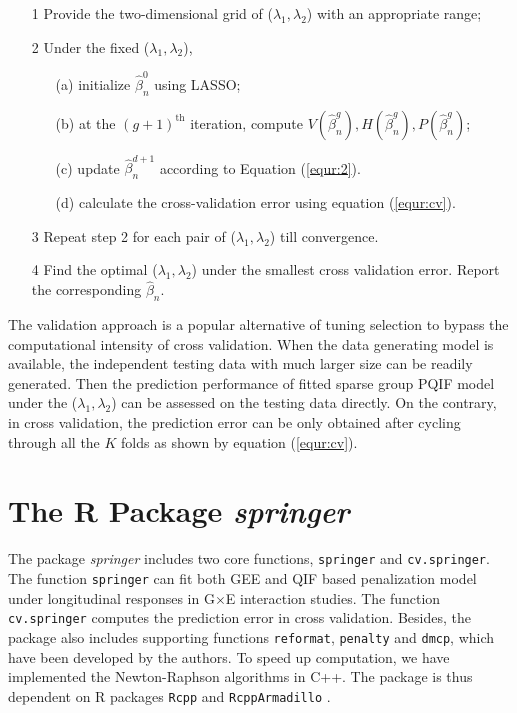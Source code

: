 \documentclass[12pt]{article}
\begin{document}
\begin{enumerate}[leftmargin=2.3em,labelsep=4mm]
	
	\item[1] \quad Provide the two-dimensional grid of ($\lambda_1, \lambda_2$) with an appropriate range;
	
	\item[2]\quad Under the fixed ($\lambda_1, \lambda_2$),\vspace{-6pt}
	\begin{enumerate}
		\item[(a)] initialize $\hat{\beta}_n^{0}$ using LASSO;
		\item[(b)] at the $(g+1)^{\text{th}}$ iteration, compute $V(\hat{\beta}_n^{g}),H(\hat{\beta}_n^{g}), P(\hat{\beta}_n^{g})$;
		\item[(c)] update $\hat{\beta}_n^{d+1}$ according to Equation (\ref{equr:2}).
		\item[(d)] calculate the cross-validation error using equation (\ref{equr:cv}).  
	\end{enumerate}
	
	\item[3]\quad Repeat step 2 for each pair of ($\lambda_1, \lambda_2$) till convergence.
	
	\item[4]\quad Find the optimal ($\lambda_1, \lambda_2$) under the smallest cross validation error. Report the corresponding $\hat{\beta}_n$.
\end{enumerate}

The validation approach is a popular alternative of tuning selection to bypass the computational intensity of cross validation. When the data generating model is available, the independent testing data with much larger size can be readily generated. Then the prediction performance of fitted sparse group PQIF model under the ($\lambda_1, \lambda_2$) can be assessed on the testing data directly. On the contrary, in cross validation, the prediction error can be only obtained after cycling through all the $K$ folds as shown by equation (\ref{equr:cv}).  



\section{The R Package \emph{springer}}

The package \emph{springer} includes two core functions,   \texttt{springer} and \texttt{cv.springer}. The function \texttt{springer} can fit both GEE and QIF based penalization model under longitudinal responses in G$\times$E interaction studies. The function \texttt{cv.springer} computes the prediction error in cross validation. Besides, the package also includes supporting functions \texttt{reformat}, \texttt{penalty} and \texttt{dmcp}, which have been developed by the authors. To speed up computation, we have implemented the Newton-Raphson algorithms in C++. The package is thus dependent on R packages   \texttt{Rcpp} and \texttt{RcppArmadillo} \cite{eddelbuettel2011rcpp,eddelbuettel2013seamless,eddelbuettel2014rcpparmadillo}.    
\end{document}
